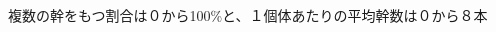 \documentclass[a0, 36pt, plainboxedsections]{sciposter} %
\renewcommand{\baselinestretch}{1.2}
\begin{document}
\begin{mdframed}[style=section.frame]
  \centering\huge\textbf{}
\end{mdframed}

\begin{multicols}{2}

\renewcommand{\baselinestretch}{0.8}
\begin{mdframed}[style=subsection.frame]
  \huge\textbf{}
\end{mdframed}
\renewcommand{\baselinestretch}{1.2}

複数の幹をもつ割合は０から100\%と、１個体あたりの平均幹数は０から８本


\end{multicols}
\end{document}
